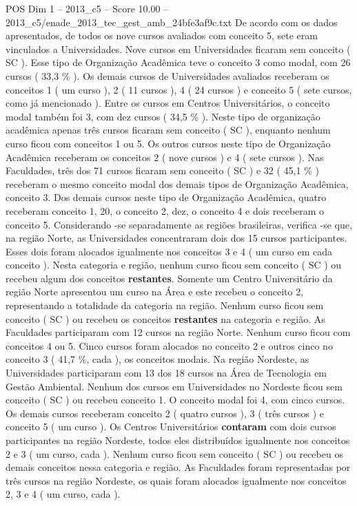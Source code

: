 \begin{textsample}{POS Dim 1 – 2013\_c5 – Score 10.00 – 2013\_c5/enade\_2013\_tec\_gest\_amb\_24bfe3af9c.txt}
De acordo com os dados apresentados, de todos os nove cursos avaliados com conceito 5, sete eram vinculados a Universidades.
Nove cursos em Universidades ficaram sem conceito ( SC ).
Esse tipo de Organização Acadêmica teve o conceito 3 como modal, com 26 cursos ( 33,3 \% ).
Os demais cursos de Universidades avaliados receberam os conceitos 1 ( um curso ), 2 ( 11 cursos ), 4 ( 24 cursos ) e conceito 5 ( sete cursos, como já mencionado ).
Entre os cursos em Centros Universitários, o conceito modal também foi 3, com dez cursos ( 34,5 \% ).
Neste tipo de organização acadêmica apenas três cursos ficaram sem conceito ( SC ), enquanto nenhum curso ficou com conceitos 1 ou 5.
Os outros cursos neste tipo de Organização Acadêmica receberam os conceitos 2 ( nove cursos ) e 4 ( sete cursos ).
Nas Faculdades, três dos 71 cursos ficaram sem conceito ( SC ) e 32 ( 45,1 \% ) receberam o mesmo conceito modal dos demais tipos de Organização Acadêmica, conceito 3.
Dos demais cursos neste tipo de Organização Acadêmica, quatro receberam conceito 1, 20, o conceito 2, dez, o conceito 4 e dois receberam o conceito 5.
Considerando -se separadamente as regiões brasileiras, verifica -se que, na região Norte, as Universidades concentraram dois dos 15 cursos participantes.
Esses dois foram alocados igualmente nos conceitos 3 e 4 ( um curso em cada conceito ).
Nesta categoria e região, nenhum curso ficou sem conceito ( SC ) ou recebeu algum dos conceitos \textbf{restantes}.
Somente um Centro Universitário da região Norte apresentou um curso na Área e este recebeu o conceito 2, representando a totalidade da categoria na região.
Nenhum curso ficou sem conceito ( SC ) ou recebeu os conceitos \textbf{restantes} na categoria e região.
As Faculdades participaram com 12 cursos na região Norte.
Nenhum curso ficou com conceitos 4 ou 5.
Cinco cursos foram alocados no conceito 2 e outros cinco no conceito 3 ( 41,7 \%, cada ), os conceitos modais.
Na região Nordeste, as Universidades participaram com 13 dos 18 cursos na Área de Tecnologia em Gestão Ambiental.
Nenhum dos cursos em Universidades no Nordeste ficou sem conceito ( SC ) ou recebeu conceito 1.
O conceito modal foi 4, com cinco cursos.
Os demais cursos receberam conceito 2 ( quatro cursos ), 3 ( três cursos ) e conceito 5 ( um curso ).
Os Centros Universitários \textbf{contaram} com dois cursos participantes na região Nordeste, todos eles distribuídos igualmente nos conceitos 2 e 3 ( um curso, cada ).
Nenhum curso ficou sem conceito ( SC ) ou recebeu os demais conceitos nessa categoria e região.
As Faculdades foram representadas por três cursos na região Nordeste, os quais foram alocados igualmente nos conceitos 2, 3 e 4 ( um curso, cada ).

\end{textsample}
